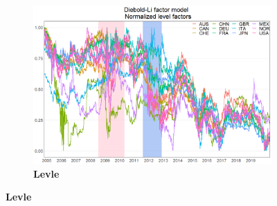 \documentclass[12pt,bibliography=totoc]{article}
\begin{document}
\begin{figure}[H]
\centering
\caption{Normlized factor time series}
\begin{subfigure}{.5\linewidth}
\centering
\includegraphics[width=\linewidth]{Normalizedlevel}
\caption{\textbf{Levle}}


\end{subfigure}
\end{figure}
\end{document}
